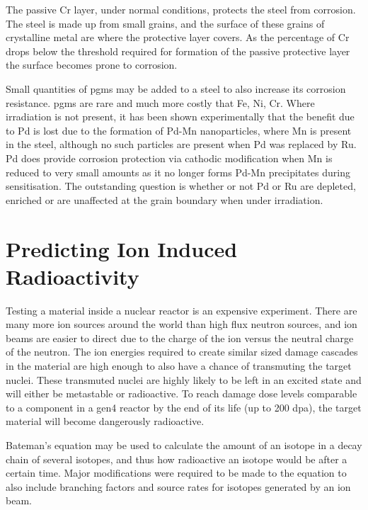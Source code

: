 The passive Cr layer, under normal conditions, protects the steel from corrosion.  The steel is made up from small grains, and the surface of these grains of crystalline metal are where the protective layer covers.  As the percentage of Cr drops below the threshold required for formation of the passive protective layer the surface becomes prone to corrosion.

Small quantities of \acrshort{pgm}s may be added to a steel to also increase its corrosion resistance.  \Acrshort{pgm}s are rare and much more costly that Fe, Ni, Cr.  Where irradiation is not present, it has been shown experimentally that the benefit due to Pd is lost due to the formation of Pd-Mn nanoparticles, where Mn is present in the steel, although no such particles are present when Pd was replaced by Ru.  Pd does provide corrosion protection via cathodic modification when Mn is reduced to very small amounts as it no longer forms Pd-Mn precipitates during sensitisation.  The outstanding question is whether or not Pd or Ru are depleted, enriched or are unaffected at the grain boundary when under irradiation.




\section{Predicting Ion Induced Radioactivity}

Testing a material inside a nuclear reactor is an expensive experiment.  There are many more ion sources around the world than high flux neutron sources, and ion beams are easier to direct due to the charge of the ion versus the neutral charge of the neutron.  The ion energies required to create similar sized damage cascades in the material are high enough to also have a chance of transmuting the target nuclei.  These transmuted nuclei are highly likely to be left in an excited state and will either be metastable or radioactive.  To reach damage dose levels comparable to a component in a \acrshort{gen4} reactor by the end of its life (up to 200 \acrshort{dpa}), the target material will become dangerously radioactive. 

Bateman's equation may be used to calculate the amount of an isotope in a decay chain of several isotopes, and thus how radioactive an isotope would be after a certain time.  Major modifications were required to be made to the equation to also include branching factors and source rates for isotopes generated by an ion beam.

